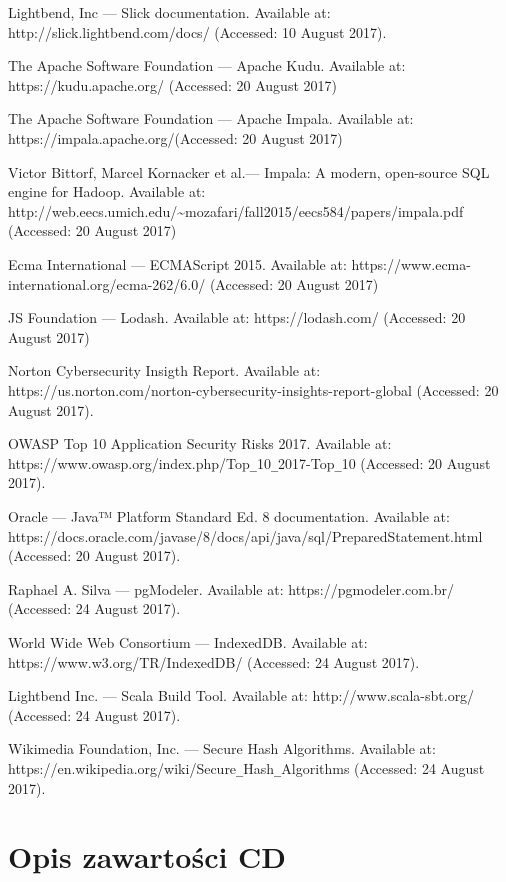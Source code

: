 \documentclass[a4paper,12pt,twoside]{article}
\begin{document}
\begin{thebibliography}{99}
Lightbend, Inc — Slick documentation. Available at:
http://slick.lightbend.com/docs/ (Accessed: 10 August 2017).

The Apache Software Foundation — Apache Kudu. Available at:
https://kudu.apache.org/ (Accessed: 20 August 2017)

The Apache Software Foundation — Apache Impala. Available at:
https://impala.apache.org/(Accessed: 20 August 2017)

Victor Bittorf, Marcel Kornacker et al.— Impala: A modern, open-source SQL engine for Hadoop.
Available at: http://web.eecs.umich.edu/\textasciitilde mozafari/fall2015/eecs584/papers/impala.pdf (Accessed: 20 August 2017)

Ecma International — ECMAScript 2015.
Available at: https://www.ecma-international.org/ecma-262/6.0/ (Accessed: 20 August 2017)

JS Foundation — Lodash.
Available at: https://lodash.com/ (Accessed: 20 August 2017)

Norton Cybersecurity Insigth Report.
Available at: https://us.norton.com/norton-cybersecurity-insights-report-global (Accessed: 20 August 2017).

OWASP Top 10 Application Security Risks 2017. Available at:
https://www.owasp.org/index.php/Top\verb!_!10\verb!_!2017-Top\verb!_!10 (Accessed: 20 August 2017).

Oracle — Java™ Platform Standard Ed. 8 documentation. Available at:
https://docs.oracle.com/javase/8/docs/api/java/sql/PreparedStatement.html (Accessed: 20 August 2017).

Raphael A. Silva — pgModeler. Available at: https://pgmodeler.com.br/
(Accessed: 24 August 2017).

World Wide Web Consortium — IndexedDB. Available at: https://www.w3.org/TR/IndexedDB/
(Accessed: 24 August 2017).

Lightbend Inc. — Scala Build Tool.
Available at: http://www.scala-sbt.org/
(Accessed: 24 August 2017).

Wikimedia Foundation, Inc. — Secure Hash Algorithms.
Available at: https://en.wikipedia.org/wiki/Secure\verb!_!Hash\verb!_!Algorithms
(Accessed: 24 August 2017).
\end{thebibliography}

\newpage
\section*{Opis zawartości CD}
\end{document}
